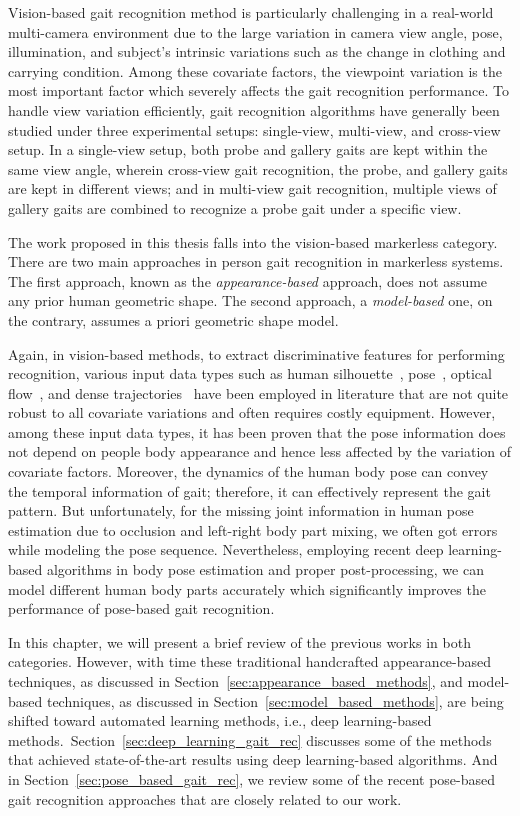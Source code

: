 Vision-based gait recognition method is particularly challenging in a real-world multi-camera environment due to the large variation in camera view angle, pose, illumination, and subject’s intrinsic variations such as the change in clothing and carrying condition. Among these covariate factors,  the viewpoint variation is the most important factor which severely affects the gait recognition performance. To handle view variation efficiently, gait recognition algorithms have generally been studied under three experimental setups: single-view, multi-view, and cross-view setup. In a single-view setup, both probe and gallery gaits are kept within the same view angle, wherein cross-view gait recognition, the probe, and gallery gaits are kept in different views; and in multi-view gait recognition, multiple views of gallery gaits are combined to recognize a probe gait under a specific view.


The work proposed in this thesis falls into the vision-based markerless category. There are two main approaches in person gait recognition in markerless systems. The first approach, known as the \textit{appearance-based} approach, does not assume any prior human geometric shape. The second approach, a \textit{model-based} one, on the contrary, assumes a priori geometric shape model.

Again, in vision-based methods, to extract discriminative features for performing recognition, various input data types such as human silhouette~\cite{Han_06}, pose~\cite{Liao_17, Liao_19}, optical flow~\cite{Wolf_16}, and dense trajectories~\cite{Chen_18} have been employed in literature that are not quite robust to all covariate variations and often requires costly equipment. However, among these input data types, it has been proven that the pose information does not depend on people body appearance and hence less affected by the variation of covariate factors. Moreover, the dynamics of the human body pose can convey the temporal information of gait; therefore, it can effectively represent the gait pattern. But unfortunately, for the missing joint information in human pose estimation due to occlusion and left-right body part mixing, we often got errors while modeling the pose sequence. Nevertheless, employing recent deep learning-based algorithms in body pose estimation and proper post-processing, we can model different human body parts accurately which significantly improves the performance of pose-based gait recognition.


In this chapter, we will present a brief review of the previous works in both categories. However, with time these traditional handcrafted appearance-based techniques, as discussed in Section~\ref{sec:appearance_based_methods}, and model-based techniques, as discussed in Section~\ref{sec:model_based_methods}, are being shifted toward automated learning methods, i.e., deep learning-based methods. Section~\ref{sec:deep_learning_gait_rec} discusses some of the methods that achieved state-of-the-art results using deep learning-based algorithms. And in Section~\ref{sec:pose_based_gait_rec}, we review some of the recent pose-based gait recognition approaches that are closely related to our work. 





